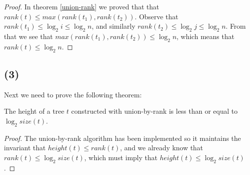 \documentclass[a4paper]{article}
\begin{document}
\begin{proof} In theorem \ref{union-rank} we proved that that \(rank(t) \le max(rank(t_1), rank(t_2))\). Observe that \(rank(t_1) \le \log_2 i \le \log_2 n\), and similarly \(rank(t_2) \le \log_2 j \le \log_2 n\). From that we see that \(max(rank(t_1), rank(t_2)) \le \log_2 n\), which means that \(rank(t) \le \log_2 n\). \end{proof}

\subsection*{(3)}

Next we need to prove the following theorem:

\begin{theorem}
The height of a tree \(t\) constructed with union-by-rank is less than or equal to \(\log_2 size(t)\).
\end{theorem}

\begin{proof}
The union-by-rank algorithm has been implemented so it maintains the invariant that \(height(t) \le rank(t)\), and we already know that \(rank(t) \le \log_2 size(t)\), which must imply that \(height(t) \le \log_2 size(t)\).
\end{proof}
\end{document}
